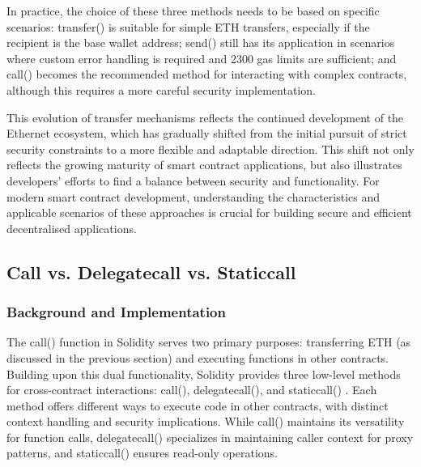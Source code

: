 \documentclass[conference]{IEEEtran}
\begin{document}
In practice, the choice of these three methods needs to be based on specific scenarios: transfer() is suitable for simple ETH transfers, especially if the recipient is the base wallet address; send() still has its application in scenarios where custom error handling is required and 2300 gas limits are sufficient; and call() becomes the recommended method for interacting with complex contracts, although this requires a more careful security implementation.

This evolution of transfer mechanisms reflects the continued development of the Ethernet ecosystem, which has gradually shifted from the initial pursuit of strict security constraints to a more flexible and adaptable direction. This shift not only reflects the growing maturity of smart contract applications, but also illustrates developers' efforts to find a balance between security and functionality. For modern smart contract development, understanding the characteristics and applicable scenarios of these approaches is crucial for building secure and efficient decentralised applications.


\vspace{1em}
\subsection{Call vs. Delegatecall vs. Staticcall}

\subsubsection{Background and Implementation}
The call() function in Solidity serves two primary purposes: transferring ETH (as discussed in the previous section) and executing functions in other contracts. Building upon this dual functionality, Solidity provides three low-level methods for cross-contract interactions: call(), delegatecall(), and staticcall() \cite{callTypes}. Each method offers different ways to execute code in other contracts, with distinct context handling and security implications. While call() maintains its versatility for function calls, delegatecall() specializes in maintaining caller context for proxy patterns, and staticcall() ensures read-only operations.
\end{document}
